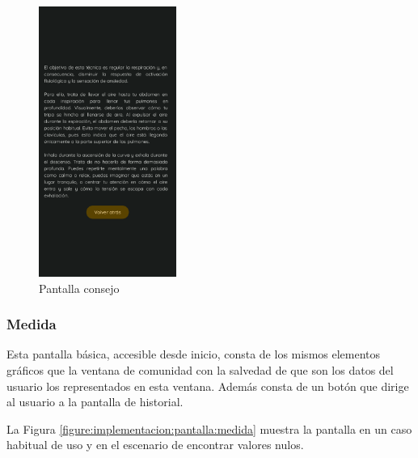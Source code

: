                 \begin{figure}[h]
                	\centering
                	\includegraphics[width=0.4\textwidth]{figures/pantallas/Consejo estres alto.png}
                	\caption{Pantalla consejo}
                	\label{figure:implementacion:pantalla:consejo}
                \end{figure}

                \clearpage  %
            \subsubsection*{Medida}
                Esta pantalla básica, accesible desde inicio, consta de los mismos elementos gráficos que la ventana de comunidad con la salvedad de que son los datos del usuario los representados en esta ventana. Además consta de un botón que dirige al usuario a la pantalla de historial.

                La Figura \ref{figure:implementacion:pantalla:medida} muestra la pantalla en un caso habitual de uso y en el escenario de encontrar valores nulos.
                
